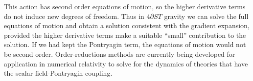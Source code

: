 \documentclass{ws-ijmpd}
\begin{document}
This action has second order equations of motion, so the higher derivative
terms do not induce new degrees of freedom.
Thus in $4\partial ST$ gravity we can solve the full equations of motion
and obtain a solution consistent with the gradient expansion,
provided the higher derivative terms make a suitable ``small'' contribution
to the solution\cite{Kovacs:2020pns,Kovacs:2020ywu}.
If we had kept the Pontryagin term, the equations of motion
would not be second order\cite{Delsate:2014hba}.
Order-reductions methods are currently being developed for application
in numerical relativity to solve for the dynamics of theories that
have the scalar field-Pontryagin coupling\cite{Okounkova:2017yby,
Okounkova:2018abo,Okounkova:2018pql,GalvezGhersi:2021sxs
}.




\end{document}
